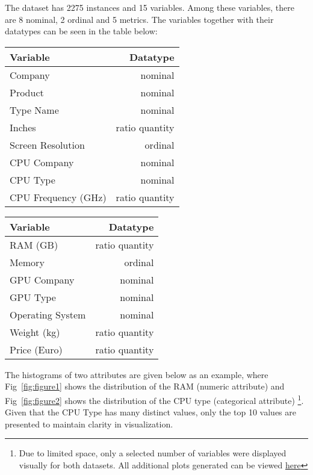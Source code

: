\documentclass{article}
\begin{document}
The dataset has 2275 instances and 15 variables. Among these variables, there are 8 nominal, 2 ordinal and 5 metrics. The variables together with their datatypes can be seen in the table below:

\begin{table}[H]
    \small
    \parbox{.40\linewidth}{
        \begin{tabular}{l|r}
            \textbf{Variable} & \textbf{Datatype} \\\hline
            Company & nominal \\
            Product & nominal \\
            Type Name & nominal \\
            Inches & ratio quantity \\
            Screen Resolution & ordinal \\
            CPU Company & nominal \\
            CPU Type & nominal \\
            CPU Frequency (GHz) & ratio quantity
        \end{tabular}
}
    \hfill
    \parbox{.40\linewidth}{
        \begin{tabular}{l|r}
            \textbf{Variable} & \textbf{Datatype} \\\hline
            RAM (GB) & ratio quantity \\
            Memory & ordinal \\
            GPU Company & nominal \\
            GPU Type & nominal \\
            Operating System & nominal \\
            Weight (kg) & ratio quantity \\
            Price (Euro) & ratio quantity 
        \end{tabular}}
        
\end{table}
The histograms of two attributes are given below as an example, where Fig~\ref{fig:figure1} shows the distribution of the RAM (numeric attribute) and Fig~\ref{fig:figure2} shows the distribution of the CPU type (categorical attribute) \footnote{Due to limited space, only a selected number of variables were displayed visually for both datasets. All additional plots generated can be viewed
\href{https://github.com/amyteresakostas/MachineLearning_2024_TUW/tree/main/ML_Exercise0}{here}}. Given that the CPU Type has many distinct values, only the top 10 values are presented to maintain clarity in visualization.
\end{document}
